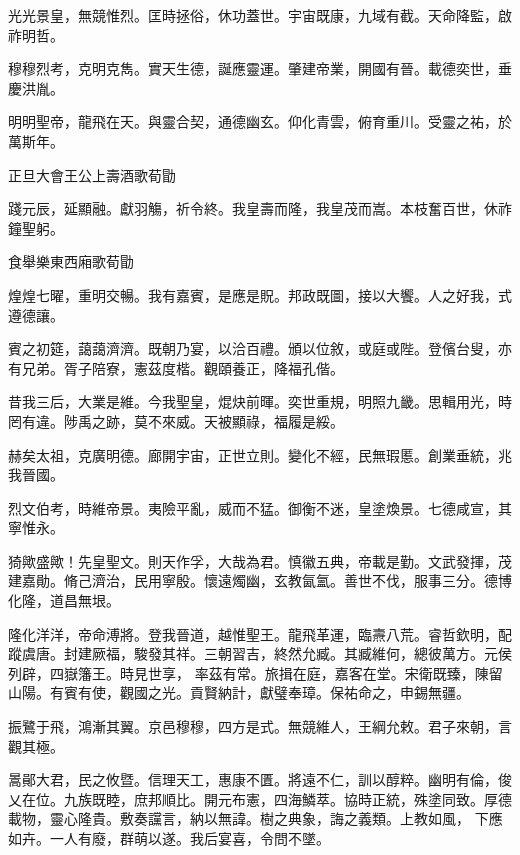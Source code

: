 \begin{pinyinscope}
 光光景皇，無競惟烈。匡時拯俗，休功蓋世。宇宙既康，九域有截。天命降監，啟祚明哲。



 穆穆烈考，克明克雋。實天生德，誕應靈運。肇建帝業，開國有晉。載德奕世，垂慶洪胤。



 明明聖帝，龍飛在天。與靈合契，通德幽玄。仰化青雲，俯育重川。受靈之祐，於萬斯年。



 正旦大會王公上壽酒歌荀勖



 踐元辰，延顯融。獻羽觴，祈令終。我皇壽而隆，我皇茂而嵩。本枝奮百世，休祚鐘聖躬。



 食舉樂東西廂歌荀勖



 煌煌七曜，重明交暢。我有嘉賓，是應是貺。邦政既圖，接以大饗。人之好我，式遵德讓。



 賓之初筵，藹藹濟濟。既朝乃宴，以洽百禮。頒以位敘，或庭或陛。登儐台叟，亦有兄弟。胥子陪寮，憲茲度楷。觀頤養正，降福孔偕。



 昔我三后，大業是維。今我聖皇，焜炔前暉。奕世重規，明照九畿。思輯用光，時罔有違。陟禹之跡，莫不來威。天被顯祿，福履是綏。



 赫矣太祖，克廣明德。廊開宇宙，正世立則。變化不經，民無瑕慝。創業垂統，兆我晉國。



 烈文伯考，時維帝景。夷險平亂，威而不猛。御衡不迷，皇塗煥景。七德咸宣，其寧惟永。



 猗歟盛歟！先皇聖文。則天作孚，大哉為君。慎徽五典，帝載是勤。文武發揮，茂建嘉勛。脩己濟治，民用寧殷。懷遠燭幽，玄教氤氳。善世不伐，服事三分。德博化隆，道昌無垠。



 隆化洋洋，帝命溥將。登我晉道，越惟聖王。龍飛革運，臨燾八荒。睿哲欽明，配蹤虞唐。封建厥福，駿發其祥。三朝習吉，終然允臧。其臧維何，總彼萬方。元侯列辟，四嶽籓王。時見世享，
 率茲有常。旅揖在庭，嘉客在堂。宋衛既臻，陳留山陽。有賓有使，觀國之光。貢賢納計，獻璧奉璋。保祐命之，申錫無疆。



 振鷺于飛，鴻漸其翼。京邑穆穆，四方是式。無競維人，王綱允敕。君子來朝，言觀其極。



 暠鄖大君，民之攸暨。信理天工，惠康不匱。將遠不仁，訓以醇粹。幽明有倫，俊乂在位。九族既睦，庶邦順比。開元布憲，四海鱗萃。協時正統，殊塗同致。厚德載物，靈心隆貴。敷奏讜言，納以無諱。樹之典象，誨之義類。上教如風，
 下應如卉。一人有廢，群萌以遂。我后宴喜，令問不墜。




\end{pinyinscope}
